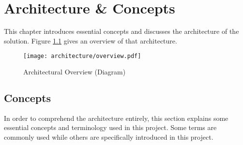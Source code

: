 \chapter{Architecture \& Concepts}

This chapter introduces essential concepts and discusses the architecture of the solution. Figure \ref{fig:architecture-overview} gives an overview of that architecture.

\begin{figure}[ht]
    \texttt{[image: architecture/overview.pdf]}
    \caption{Architectural Overview (Diagram)}
    \label{fig:architecture-overview}
\end{figure}

\section{Concepts}

In order to comprehend the architecture entirely, this section explains some essential concepts and terminology used in this project. Some terms are commonly used while others are specifically introduced in this project.

